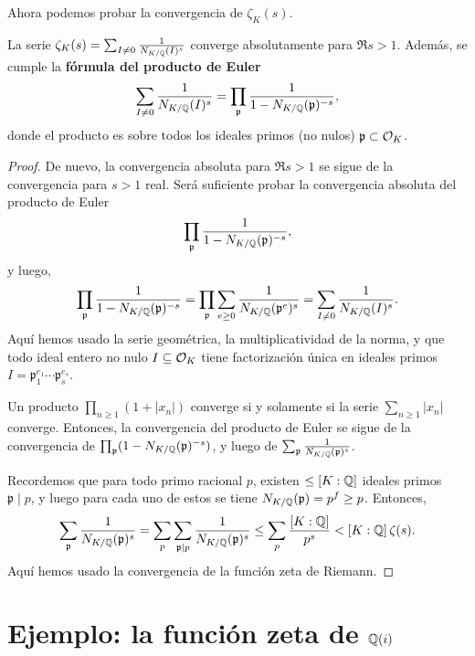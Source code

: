 Ahora podemos probar la convergencia de $\zeta_K (s)$.

\begin{proposicion}
  La serie $\zeta_K (s) = \sum_{I \ne 0} \frac{1}{N_{K/\mathbb{Q}} (I)^s}$ converge
  absolutamente para $\Re s > 1$. Además, se cumple la
  \textbf{fórmula del producto de Euler}
  \[ \sum_{I \ne 0} \frac{1}{N_{K/\mathbb{Q}} (I)^s} =
     \prod_{\mathfrak{p}} \frac{1}{1 - N_{K/\mathbb{Q}} (\mathfrak{p})^{-s}}, \]
  donde el producto es sobre todos los ideales primos (no nulos)
  $\mathfrak{p} \subset \mathcal{O}_K$.

  \begin{proof}
    De nuevo, la convergencia absoluta para $\Re s > 1$ se sigue de la
    convergencia para $s > 1$ real. Será suficiente probar la convergencia
    absoluta del producto de Euler
    $$\prod_{\mathfrak{p}} \frac{1}{1 - N_{K/\mathbb{Q}} (\mathfrak{p})^{-s}},$$
    y luego,
    \[ \prod_{\mathfrak{p}} \frac{1}{1 - N_{K/\mathbb{Q}} (\mathfrak{p})^{-s}} =
       \prod_{\mathfrak{p}} \sum_{e \ge 0} \frac{1}{N_{K/\mathbb{Q}} (\mathfrak{p}^e)^s} =
       \sum_{I\ne 0} \frac{1}{N_{K/\mathbb{Q}} (I)^s}. \]
    Aquí hemos usado la serie geométrica, la multiplicatividad de la norma, y
    que todo ideal entero no nulo $I \subseteq \mathcal{O}_K$ tiene factorización única
    en ideales primos $I = \mathfrak{p}_1^{e_1}\cdots \mathfrak{p}_s^{e_s}$.

    Un producto $\prod_{n\ge 1} (1 + |x_n|)$ converge si y solamente si la serie
    $\sum_{n\ge 1} |x_n|$ converge. Entonces, la convergencia del producto de
    Euler se sigue de la convergencia de
    $\prod_{\mathfrak{p}} (1 - N_{K/\mathbb{Q}} (\mathfrak{p})^{-s})$, y luego de
    $\sum_{\mathfrak{p}} \frac{1}{N_{K/\mathbb{Q}} (\mathfrak{p})^s}$.

    Recordemos que para todo primo racional $p$, existen $\le [K:\mathbb{Q}]$ ideales
    primos $\mathfrak{p} \mid p$, y luego para cada uno de estos se tiene
    $N_{K/\mathbb{Q}} (\mathfrak{p}) = p^f \ge p$. Entonces,
    \[ \sum_{\mathfrak{p}} \frac{1}{N_{K/\mathbb{Q}} (\mathfrak{p})^s} =
       \sum_p \sum_{\mathfrak{p} \mid p} \frac{1}{N_{K/\mathbb{Q}} (\mathfrak{p})^s} \le
       \sum_p \frac{[K:\mathbb{Q}]}{p^s} < [K : \mathbb{Q}]\,\zeta (s). \]
    Aquí hemos usado la convergencia de la función zeta de Riemann.
  \end{proof}
\end{proposicion}


\section{Ejemplo: la función zeta de \texorpdfstring{$\mathbb{Q} (i)$}{ℚ(i)}}
\label{sec:funcion-zeta-de-Q(i)}


